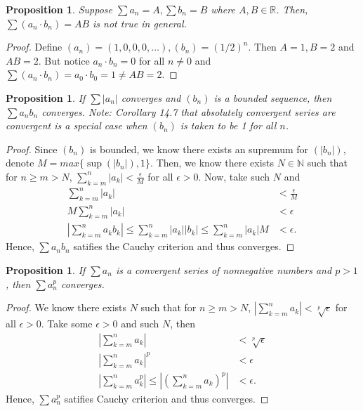 \documentclass{article}
\newtheorem{proposition}[thm]{Proposition}
\begin{document}
\begin{proposition}
    Suppose $\sum a_n=A, \sum b_n=B$  where $A, B \in \mathbb{R}$. Then, $\sum (a_n\cdot b_n)=AB$
    is not true in general.
\end{proposition}
\begin{proof}
    Define $(a_n) = (1, 0, 0, 0, \dots), (b_n) = (1/2)^n$. Then $A=1, B=2$ and $AB = 2$. But notice 
    $a_n\cdot b_n = 0$ for all $n\neq 0$ and $\sum(a_n\cdot b_n) = a_0\cdot b_0 = 1\neq AB = 2$.
\end{proof}

\newpage
\begin{proposition}
    If $\sum|a_n|$ converges and $(b_n)$ is a bounded sequence, then $\sum a_nb_n$ converges.
    Note: Corollary 14.7 that absolutely convergent series are convergent is a special case when 
    $(b_n)$ is taken to be 1 for all $n$.
\end{proposition}
\begin{proof}
    Since $(b_n)$ is bounded, we know there exists an supremum for $(|b_n|)$, denote 
    $M = max\{\sup(|b_n|),1\}$. Then, we know there exists $N\in\mathbb{N}$ such that for $n\ge m>N$, 
    $\sum_{k=m}^n|a_k|<\frac{\epsilon}{M}$ for all $\epsilon>0$. Now, take such $N$ and
    \begin{align*}
        \sum_{k=m}^n|a_k| & < \frac{\epsilon}{M} \\
        M\sum_{k=m}^{n}|a_k| & < \epsilon \\
        \left|\sum_{k=m}^{n}a_kb_k\right| \le \sum_{k=m}^{n}|a_k||b_k| \le \sum_{k=m}^{n}|a_k|M & < \epsilon.
    \end{align*}
    Hence, $\sum a_nb_n$ satifies the Cauchy criterion and thus converges.
\end{proof}

\begin{proposition}
    If $\sum a_n$ is a convergent series of nonnegative numbers and $p>1$, then $\sum a^p_n$ 
    converges.
\end{proposition}
\begin{proof}
    We know there exists $N$ such that for $n\ge m>N$, 
    $\left|\sum_{k=m}^{n}a_k\right|<\sqrt[p]{\epsilon}$ for all $\epsilon>0$.
    Take some $\epsilon>0$ and such $N$, then
    \begin{align*}
        \left|\sum_{k=m}^{n}a_k\right| & < \sqrt[p]{\epsilon} \\
        \left|\sum_{k=m}^{n}a_k\right|^p & < \epsilon \\
        \left|\sum_{k=m}^na_k^p\right| \le \left|\left(\sum_{k=m}^na_k\right)^p\right| & < \epsilon.
    \end{align*}
    Hence, $\sum a_n^p$ satifies Cauchy criterion and thus converges.
\end{proof}
\end{document}
